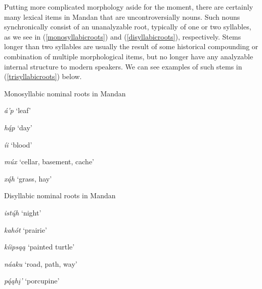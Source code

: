 Putting more complicated morphology aside for the moment, there are certainly many lexical items in Mandan that are uncontroversially nouns. Such nouns synchronically consist of an unanalyzable root, typically of one or two syllables, as we see in (\ref{monosyllabicroots}) and (\ref{disyllabicroots}), respectively. Stems longer than two syllables are usually the result of some historical compounding or combination of multiple morphological items, but no longer have any analyzable internal structure to modern speakers. We can see examples of such stems in (\ref{trisyllabicroots}) below.

\begin{exe}

\item\label{monosyllabicroots} Monosyllabic nominal roots in Mandan

    \begin{xlist}
    
    \item \textit{á'p} `leaf'
    
    \item \textit{hą́p} `day'
    
    \item \textit{íi} `blood'
    
    \item \textit{múx} `cellar, basement, cache'
    
    \item \textit{xą́h} `grass, hay'
    
    \end{xlist}
    
\item\label{disyllabicroots} Disyllabic nominal roots in Mandan

    \begin{xlist}
    
    \item \textit{istų́h} `night'
    
    \item \textit{kahót} `prairie'
    
    \item \textit{kíipsąą} `painted turtle'
    
    \item \textit{náaku} `road, path, way'
    
    \item \textit{pą́ąhį'} `porcupine'
    
    \end{xlist}
    

\end{exe}
